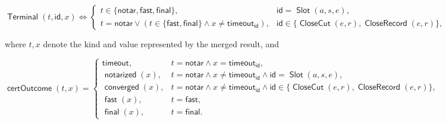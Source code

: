 \documentclass[sigplan,twocolumn,review,anonymous]{acmart}
\newcommand{\func}[1]{\operatorname{\mathsf{#1}}}
\newcommand{\id}{\mathsf{id}}
\newcommand{\Slot}{\func{Slot}}
\newcommand{\CloseCut}{\func{CloseCut}}
\newcommand{\CloseRecord}{\func{CloseRecord}}
\newcommand{\certOutcome}{\func{certOutcome}}
\newcommand{\Terminal}{\func{Terminal}}
\newcommand{\timeoutVal}{\mathsf{timeout}}
\newcommand{\timeoutOutcome}{\mathsf{timeout}}
\newcommand{\notarized}{\func{notarized}}
\newcommand{\converged}{\func{converged}}
\newcommand{\fast}{\func{fast}}
\newcommand{\final}{\func{final}}
\newcommand{\notarKind}{\mathsf{notar}}
\newcommand{\fastKind}{\mathsf{fast}}
\newcommand{\finalKind}{\mathsf{final}}
\begin{document}
\begin{center}
\begin{adjustbox}{max width=\columnwidth}
\(\displaystyle
\Terminal(t,\id,x)\iff
\begin{cases}
    t\in\{\notarKind,\fastKind,\finalKind\}, & \id=\Slot(a,s,e),\\
    t=\notarKind\vee(t\in\{\fastKind,\finalKind\}\wedge x\neq\timeoutVal_\id),
        & \id\in\{\CloseCut(e,r),\CloseRecord(e,r)\},
\end{cases}
\)
\end{adjustbox}
\end{center}
where \(t,x\) denote the kind and value represented by the merged result, and
\begin{center}
\begin{adjustbox}{max width=\columnwidth}
\(\displaystyle
\certOutcome(t,x)=
\begin{cases}
\timeoutOutcome, & t=\notarKind\wedge x=\timeoutVal_\id,\\
\notarized(x), & t=\notarKind\wedge x\neq\timeoutVal_\id\wedge\id=\Slot(a,s,e),\\
\converged(x), & t=\notarKind\wedge x\neq\timeoutVal_\id\wedge\id\in\{\CloseCut(e,r),\CloseRecord(e,r)\},\\
\fast(x), & t=\fastKind,\\
\final(x), & t=\finalKind.
\end{cases}
\)
\end{adjustbox}
\end{center}
\end{document}
